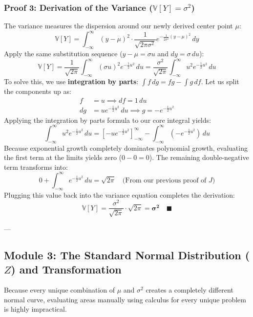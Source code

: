 \documentclass{article}
\begin{document}
\subsubsection*{Proof 3: Derivation of the Variance ($\mathbb{V}[Y] = \sigma^2$)}
The variance measures the dispersion around our newly derived center point $\mu$:
\begin{equation}
    \mathbb{V}[Y] = \int_{-\infty}^{\infty} (y - \mu)^2 \cdot \frac{1}{\sqrt{2\pi\sigma^2}} e^{-\frac{1}{2\sigma^2}(y-\mu)^2} \, dy
\end{equation}
Apply the same substitution sequence ($y - \mu = \sigma u$ and $dy = \sigma \, du$):
\begin{equation}
    \mathbb{V}[Y] = \frac{1}{\sqrt{2\pi}} \int_{-\infty}^{\infty} (\sigma u)^2 e^{-\frac{1}{2}u^2} \, du = \frac{\sigma^2}{\sqrt{2\pi}} \int_{-\infty}^{\infty} u^2 e^{-\frac{1}{2}u^2} \, du
\end{equation}
To solve this, we use \textbf{integration by parts}: $\int f \, dg = fg - \int g \, df$. Let us split the components up as:
\begin{align*}
    f &= u \implies df = 1 \, du \\
    dg &= u e^{-\frac{1}{2}u^2} \, du \implies g = -e^{-\frac{1}{2}u^2}
\end{align*}
Applying the integration by parts formula to our core integral yields:
\begin{equation}
    \int_{-\infty}^{\infty} u^2 e^{-\frac{1}{2}u^2} \, du = \left[ -u e^{-\frac{1}{2}u^2} \right]_{-\infty}^{\infty} - \int_{-\infty}^{\infty} \left( -e^{-\frac{1}{2}u^2} \right) \, du
\end{equation}
Because exponential growth completely dominates polynomial growth, evaluating the first term at the limits yields zero ($0 - 0 = 0$). The remaining double-negative term transforms into:
\begin{equation}
    0 + \int_{-\infty}^{\infty} e^{-\frac{1}{2}u^2} \, du = \sqrt{2\pi} \quad \text{(From our previous proof of } J)
\end{equation}
Plugging this value back into the variance equation completes the derivation:
\begin{equation}
    \mathbb{V}[Y] = \frac{\sigma^2}{\sqrt{2\pi}} \cdot \sqrt{2\pi} = \mathbf{\sigma^2} \quad \blacksquare
\end{equation}

---

\subsection*{Module 3: The Standard Normal Distribution ($Z$) and Transformation}
Because every unique combination of $\mu$ and $\sigma^2$ creates a completely different normal curve, evaluating areas manually using calculus for every unique problem is highly impractical. 
\end{document}
